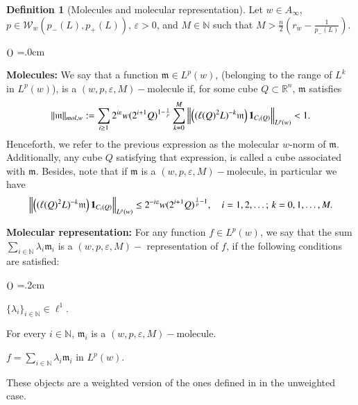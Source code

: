 \documentclass[11pt, a4paper,leqno]{amsart}
\newcommand{\mm}{\mathfrak{m}}
\renewcommand{\chi}{{\bf 1}}
\theoremstyle{plain}
\theoremstyle{definition}
\newtheorem{definition}[equation]{Definition}
\theoremstyle{remark}
\numberwithin{equation}{section}
\def \N{ \mathbb{N} }
\def \mol{ (w,p,\varepsilon,M)-\textrm{molecule}}
\begin{document}
\begin{definition}[Molecules and molecular representation]\label{moleculas}
Let $w\in A_{\infty}$, $p\in \mathcal{W}_w(p_-(L),p_+(L))$,
$\varepsilon >0$, and $ M\in \N$ such that $M>\frac{n}{2}\left(r_w-\frac{1}{p_-(L)}\right)$.
\begin{list}{$(\theenumi)$}{\leftmargin=1cm \itemsep=0.2cm\topsep=.0cm \renewcommand{\theenumi}{\alph{enumi}}}

\item \textbf{Molecules:} We say that a function $\mm\in L^p(w)$, (belonging to the range of $L^k$ in $L^p(w)$), is a $\mol$ if, for some cube $Q\subset \mathbb{R}^n$, $\mm$ satisfies
\begin{align*}
\|\mm\|_{mol,w}:=\sum_{i\geq 1}2^{i\varepsilon}w(2^{i+1}Q)^{1-\frac{1}{p}}\sum_{k=0}^{M}\left\|\left((\ell(Q)^2L)^{-k}\mm\right)\chi_{C_i(Q)}\right\|_{L^p(w)}<1.
\end{align*}
Henceforth, we refer to the previous expression as the molecular $w$-norm of $\mm$. Additionally, any cube $Q$ satisfying that expression, is called a cube associated with $\mm$. Besides, note that
 if $\mm$ is a $\mol$, in particular we have
\begin{align}\label{astast}
\left\|\left((\ell(Q)^2L)^{-k}\mm\right)
    \chi_{C_i(Q)}\right\|_{L^p(w)}
    \leq 2^{-i\varepsilon}w(2^{i+1}Q)^{\frac{1}{p}-1}, \quad i=1,2,\dots; \, k=0, 1,\ldots, M.
\end{align}




\item  \textbf{Molecular representation:} For any function $f\in L^p(w)$, we say that the sum $\sum_{i\in \N}\lambda_i\mm_i $ is a $(w,p,\varepsilon,M)-$ representation of $f$, if the following conditions are satisfied:
\begin{list}{$(\theenumi)$}{\leftmargin=1cm \itemsep=0.2cm\topsep=.2cm \renewcommand{\theenumi}{\roman{enumi}}}

\item $\displaystyle\{\lambda_i\}_{i\in \N}\in \ell^1$.
\item For every $i\in\N$, $\mm_i$ is a $\mol$.
\item  $f=\sum_{i\in \N}\lambda_i\mm_i$ in $L^p(w)$.
\end{list}

\end{list}

\end{definition}
These objects are a weighted version of the ones defined in \cite{HofmannMayboroda} in the unweighted case.
\end{document}

